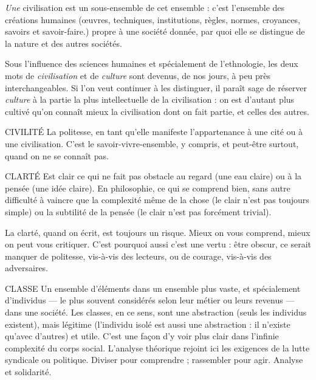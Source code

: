 {\it Une} civilisation est un sous-ensemble de cet ensemble : c’est l’ensemble des
créations humaines (œuvres, techniques, institutions, règles, normes, croyances,
savoirs et savoir-faire.) propre à une société donnée, par quoi elle se distingue
de la nature et des autres sociétés.

Sous l'influence des sciences humaines et spécialement de l’ethnologie, les
deux mots de {\it civilisation} et de {\it culture} sont devenus, de nos jours, à peu près
interchangeables. Si l’on veut continuer à les distinguer, il paraît sage de
réserver {\it culture} à la partie la plus intellectuelle de la civilisation : on est d’autant
plus cultivé qu’on connaît mieux la civilisation dont on fait partie, et celles des
autres.

CIVILITÉ La politesse, en tant qu’elle manifeste l’appartenance à une cité
ou à une civilisation. C’est le savoir-vivre-ensemble, y compris,
et peut-être surtout, quand on ne se connaît pas.

CLARTÉ Est clair ce qui ne fait pas obstacle au regard (une eau claire) ou à
la pensée (une idée claire). En philosophie, ce qui se comprend
bien, sans autre difficulté à vaincre que la complexité même de la chose (le clair
n’est pas toujours simple) ou la subtilité de la pensée (le clair n’est pas forcément trivial).

La clarté, quand on écrit, est toujours un risque. Mieux on vous comprend,
mieux on peut vous critiquer. C’est pourquoi aussi c’est une vertu : être obscur,
ce serait manquer de politesse, vis-à-vis des lecteurs, ou de courage, vis-à-vis des
adversaires.

CLASSE Un ensemble d’éléments dans un ensemble plus vaste, et spécialement
d’individus — le plus souvent considérés selon leur métier ou
leurs revenus — dans une société. Les classes, en ce sens, sont une abstraction
(seuls les individus existent), mais légitime (l'individu isolé est aussi une
abstraction : il n’existe qu'avec d’autres) et utile. C’est une façon d’y voir plus
clair dans l’infinie complexité du corps social. L'analyse théorique rejoint ici les
exigences de la lutte syndicale ou politique. Diviser pour comprendre ; rassembler
pour agir. Analyse et solidarité.

